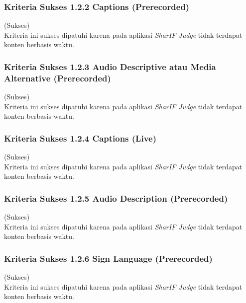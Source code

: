 \documentclass[a4paper,twoside]{article}
\begin{document}
\begin{enumerate}
		\subsubsection*{Kriteria Sukses 1.2.2 Captions (Prerecorded)}
		\label{subsubsec:kepatuhan_kriteria_1.2.2}
		(Sukses) \\
		
		Kriteria ini sukses dipatuhi karena pada aplikasi \textit{SharIF Judge} tidak terdapat konten berbasis waktu.
		
		\subsubsection*{Kriteria Sukses 1.2.3 Audio Descriptive atau Media Alternative (Prerecorded)}
		\label{subsubsec:kepatuhan_kriteria_1.2.3}
		(Sukses) \\
		
		Kriteria ini sukses dipatuhi karena pada aplikasi \textit{SharIF Judge} tidak terdapat konten berbasis waktu.
		
		\subsubsection*{Kriteria Sukses 1.2.4 Captions (Live)}
		\label{subsubsec:kepatuhan_kriteria_1.2.4}
		(Sukses) \\
		
		Kriteria ini sukses dipatuhi karena pada aplikasi \textit{SharIF Judge} tidak terdapat konten berbasis waktu.
		
		\subsubsection*{Kriteria Sukses 1.2.5 Audio Description (Prerecorded)}
		\label{subsubsec:kepatuhan_kriteria_1.2.5}
		(Sukses) \\
		
		Kriteria ini sukses dipatuhi karena pada aplikasi \textit{SharIF Judge} tidak terdapat konten berbasis waktu.
		
		\subsubsection*{Kriteria Sukses 1.2.6 Sign Language (Prerecorded)}
		\label{subsubsec:kepatuhan_kriteria_1.2.6}
		(Sukses) \\
		
		Kriteria ini sukses dipatuhi karena pada aplikasi \textit{SharIF Judge} tidak terdapat konten berbasis waktu.
		

\end{enumerate}
\end{document}
